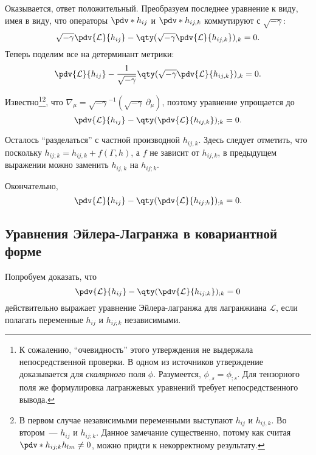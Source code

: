 \documentclass[\docroot/reports/draft/report.tex]{subfiles}
\begin{document}
    Оказывается, ответ положительный. Преобразуем последнее уравнение к виду, имея в виду, что операторы $\pdv*{h_{ij}}$ и $\pdv*{h_{ij,k}}$ коммутируют с $\sqrt{-\gamma}$:
    \begin{equation}
        \sqrt{-\gamma}\pdv{\mathcal{L}}{h_{ij}} - \qty(\sqrt{-\gamma}\pdv{\mathcal{L}}{h_{ij,k}})_{,k} = 0 .
    \end{equation}
    Теперь поделим все на детерминант метрики:
    \begin{equation}
        \pdv{\mathcal{L}}{h_{ij}} - \frac{1}{\sqrt{-\gamma}}\qty(\sqrt{-\gamma}\pdv{\mathcal{L}}{h_{ij,k}})_{,k} = 0 .
    \end{equation}

    Известно\footnote{
        К сожалению, \enquote{очевидность} этого утверждения не выдержала непосредственной проверки. В одном из источников утверждение доказывается для \textit{скалярного} поля $\phi$. Разумеется, $\phi_{,s} = \phi_{;s}$. Для тензорного поля же формулировка лагранжевых уравнений требует непосредственного вывода.
    }\footnote{
        В первом случае независимыми переменными выступают $h_{ij}$ и $h_{ij,k}$. Во втором~--- $h_{ij}$ и $h_{ij;k}$. Данное замечание существенно, потому как считая $\pdv*{h_{ij;k}}{h_{lm}} \neq 0$, можно придти к некорректному результату.
    }, что $\nabla_\mu = {\sqrt{-\gamma}}^{-1}(\sqrt{-\gamma}\ \partial_\mu)$, поэтому уравнение упрощается до
    \begin{equation}
        \pdv{\mathcal{L}}{h_{ij}} - \qty(\pdv{\mathcal{L}}{h_{ij,k}})_{;k} = 0 .
    \end{equation}

    Осталось \enquote{разделаться} с частной производной $h_{ij,k}$. Здесь следует отметить, что поскольку $h_{ij;k} = h_{ij,k} + f(\Gamma, h)$, а $f$ не зависит от $h_{ij,k}$, в предыдущем выражении можно заменить $h_{ij,k}$ на $h_{ij;k}$.

    Окончательно,
    \begin{equation}
        \pdv{\mathcal{L}}{h_{ij}} - \qty(\pdv{\mathcal{L}}{h_{ij;k}})_{;k} = 0 .
    \end{equation}

\subsection{Уравнения Эйлера-Лагранжа в ковариантной форме}

    Попробуем доказать, что
    \begin{equation*}
        \pdv{\mathcal{L}}{h_{ij}} - \qty(\pdv{\mathcal{L}}{h_{ij;k}})_{;k} = 0
    \end{equation*}
    действительно выражает уравнение Эйлера-лагранжа для лагранжиана $\mathcal{L}$, если полагать переменные $h_{ij}$ и $h_{ij;k}$ независимыми.
\end{document}
